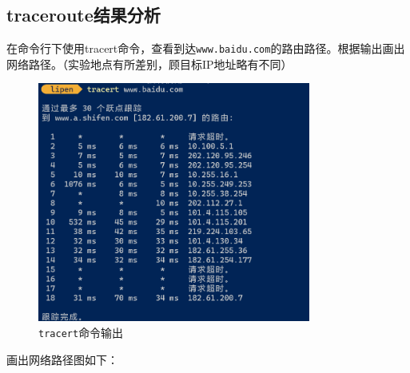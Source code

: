 \documentclass{article}
\begin{document}
\subsection{traceroute结果分析}

在命令行下使用tracert命令，查看到达\texttt{www.baidu.com}的路由路径。根据输出画出网络路径。（实验地点有所差别，顾目标IP地址略有不同）

\begin{figure}[H]
  \centering
  \includegraphics[width=0.8\textwidth]{img/22.png}
  \caption{\texttt{tracert}命令输出}
  \label{fig:21}
\end{figure}

画出网络路径图如下：
\end{document}
